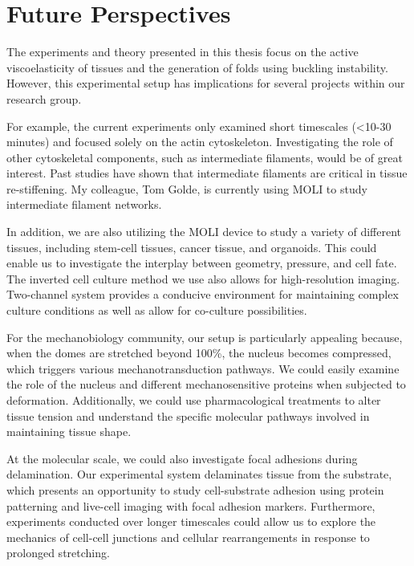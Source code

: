 \newpage
\hypertarget{future-perspectives}{%
	\section{Future Perspectives}\label{future-perspectives}}

The experiments and theory presented in this thesis focus on the active viscoelasticity of tissues and the generation of folds using buckling instability. However, this experimental setup has implications for several projects within our research group.

For example, the current experiments only examined short timescales (<10-30 minutes) and focused solely on the actin cytoskeleton. Investigating the role of other cytoskeletal components, such as intermediate filaments, would be of great interest. Past studies have shown that intermediate filaments are critical in tissue re-stiffening. My colleague, Tom Golde, is currently using MOLI to study intermediate filament networks.

In addition, we are also utilizing the MOLI device to study a variety of different tissues, including stem-cell tissues, cancer tissue, and organoids. This could enable us to investigate the interplay between geometry, pressure, and cell fate. The inverted cell culture method we use also allows for high-resolution imaging. Two-channel system provides a conducive environment for maintaining complex culture conditions as well as allow for co-culture possibilities.

For the mechanobiology community, our setup is particularly appealing because, when the domes are stretched beyond 100\%, the nucleus becomes compressed, which triggers various mechanotransduction pathways. We could easily examine the role of the nucleus and different mechanosensitive proteins when subjected to deformation. Additionally, we could use pharmacological treatments to alter tissue tension and understand the specific molecular pathways involved in maintaining tissue shape.

At the molecular scale, we could also investigate focal adhesions during delamination. Our experimental system delaminates tissue from the substrate, which presents an opportunity to study cell-substrate adhesion using protein patterning and live-cell imaging with focal adhesion markers. Furthermore, experiments conducted over longer timescales could allow us to explore the mechanics of cell-cell junctions and cellular rearrangements in response to prolonged stretching.

